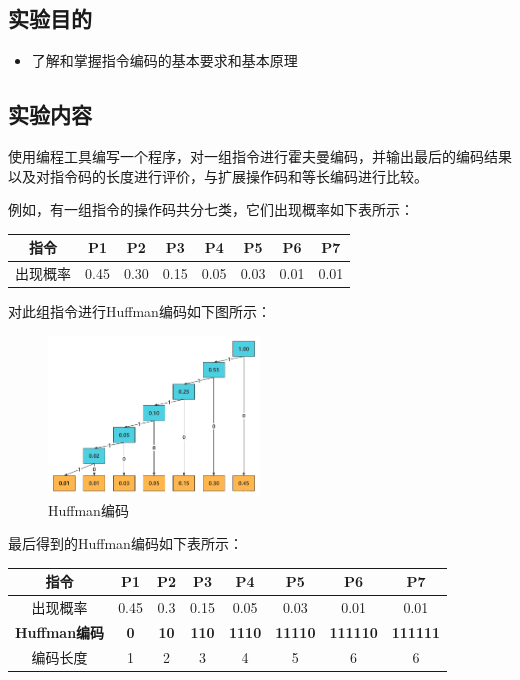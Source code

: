 \documentclass[UTF8,12pt]{article}
\begin{document}
\subsection{实验目的}
\begin{itemize}
    \item 了解和掌握指令编码的基本要求和基本原理
\end{itemize}

\subsection{实验内容}
使用编程工具编写一个程序，对一组指令进行霍夫曼编码，并输出最后的编码结果以及对指令码的长度进行评价，与扩展操作码和等长编码进行比较。

例如，有一组指令的操作码共分七类，它们出现概率如下表所示：
\begin{table}[htbp]
\centering
\begin{tabular}{c|c|c|c|c|c|c|c}
\hline
指令   & P1   & P2  & P3   & P4   & P5   & P6   & P7   \\ \hline
出现概率 & 0.45 & 0.30 & 0.15 & 0.05 & 0.03 & 0.01 & 0.01 \\ \hline
\end{tabular}
\end{table}

对此组指令进行Huffman编码如下图所示：
\begin{figure}[htbp]
    \centering
    \includegraphics[width=0.5\textwidth]{imgs/1.png}
    \caption{Huffman编码}
\end{figure}

最后得到的Huffman编码如下表所示：

\begin{table}[htbp]
    \centering
    \begin{tabular}{cccccccc}
    \hline
    \textbf{指令}        & \textbf{P1} & \textbf{P2} & \textbf{P3}  & \textbf{P4}   & \textbf{P5}    & \textbf{P6}     & \textbf{P7}     \\ \hline
    出现概率               & 0.45        & 0.3         & 0.15         & 0.05          & 0.03           & 0.01            & 0.01            \\
    \textbf{Huffman编码} & \textbf{0}  & \textbf{10} & \textbf{110} & \textbf{1110} & \textbf{11110} & \textbf{111110} & \textbf{111111} \\
    编码长度               & 1           & 2           & 3            & 4             & 5              & 6               & 6               \\ \hline
    \end{tabular}
\end{table}
\end{document}
